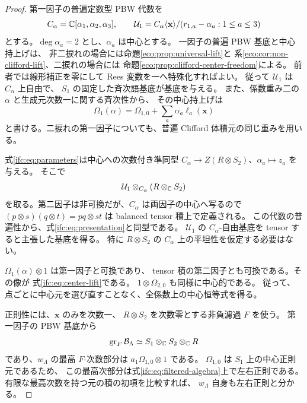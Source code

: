\begin{proof}
第一因子の普遍定数型 PBW 代数を
\[
 C_\alpha=\mathbb C[\alpha_1,\alpha_2,\alpha_3],\qquad
 \mathcal U_1=C_\alpha\langle\mathbf x\rangle/
                         (r_{1,a}-\alpha_a:1\le a\le3)
\]
とする。$\deg\alpha_a=2$ とし、$\alpha_a$ は中心とする。
一因子の普遍 PBW 基底と中心持上げは、
非二捩れの場合には命題\ref{eco:prop:universal-lift}と
系\ref{eco:cor:non-clifford-lift}、二捩れの場合には
命題\ref{eco:prop:clifford-center-freedom}による。
前者では線形補正を零にして Rees 変数を一へ特殊化すればよい。
従って $\mathcal U_1$ は $C_\alpha$ 上自由で、
$S_1$ の固定した斉次語基底が基底を与える。
また、係数重み二の $\alpha$ と生成元次数一に関する斉次性から、
その中心持上げは
\[
              \Omega_1(\alpha)
                  =\Omega_{1,0}+\sum_a\alpha_a\ell_a(\mathbf x)
\]
と書ける。二捩れの第一因子についても、普遍 Clifford 体積元の同じ重みを用いる。

式\eqref{ifc:eq:parameters}は中心への次数付き準同型
$C_\alpha\to Z(R\otimes S_2)$、$\alpha_a\mapsto z_a$ を与える。
そこで
\begin{equation}\label{ifc:eq:central-base-change}
           \mathcal U_1\otimes_{C_\alpha}(R\otimes_\mathbb C S_2)
\end{equation}
を取る。第二因子は非可換だが、$C_\alpha$ は両因子の中心へ写るので
$(p\otimes s)(q\otimes t)=pq\otimes st$ は balanced tensor 積上で定義される。
この代数の普遍性から、式\eqref{ifc:eq:presentation}と同型である。
$\mathcal U_1$ の $C_\alpha$-自由基底を tensor すると主張した基底を得る。
特に $R\otimes S_2$ の $C_\alpha$ 上の平坦性を仮定する必要はない。

$\Omega_1(\alpha)\otimes1$ は第一因子と可換であり、
tensor 積の第二因子とも可換である。その像が
式\eqref{ifc:eq:center-lift}である。
$1\otimes\Omega_{2,0}$ も同様に中心的である。
従って、点ごとに中心元を選び直すことなく、全係数上の中心恒等式を得る。

正則性には、$\mathbf x$ のみを次数一、
$R\otimes S_2$ を次数零とする非負濾過 $F$ を使う。
第一因子の PBW 基底から
\begin{equation}\label{ifc:eq:filtered-algebra}
          \operatorname{gr}_F\mathcal B_\Lambda
                 \simeq S_1\otimes_\mathbb C S_2\otimes_\mathbb C R
\end{equation}
であり、$w_\Lambda$ の最高 $F$-次数部分は
$a_1\Omega_{1,0}\otimes1$ である。
$\Omega_{1,0}$ は $S_1$ 上の中心正則元であるため、
この最高次部分は式\eqref{ifc:eq:filtered-algebra}上で左右正則である。
有限な最高次数を持つ元の積の初項を比較すれば、
$w_\Lambda$ 自身も左右正則と分かる。


\end{proof}

